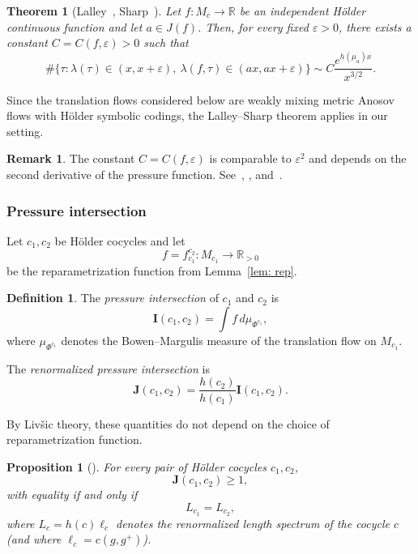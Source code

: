 \documentclass[12pt]{amsart}
\numberwithin{equation}{section}
\numberwithin{figure}{section}
\newtheorem{theorem}[equation]{Theorem}
\newtheorem{proposition}[equation]{Proposition}
\theoremstyle{definition}
\newtheorem{remark}[equation]{Remark}
\newtheorem{definition}[equation]{Definition}
\theoremstyle{plain}
\begin{document}
\begin{theorem}[{Lalley~\cite[Theorem~I]{Lalley97:AxiomA}, Sharp~\cite[Theorem~1]{Sharp92:PrimeOrbit}}]
\label{prop:lalley}
Let $f:M_c\to\mathbb R$ be an independent H\"older continuous function and let $a\in J(f)$. Then, for every fixed $\varepsilon>0$, there exists a constant $C=C(f,\varepsilon)>0$ such that
\[
\#\{
\tau:
\lambda(\tau)\in(x,x+\varepsilon),
\
\lambda(f,\tau)\in(ax,ax+\varepsilon)
\}
\sim
C\frac{e^{h(\mu_a)x}}{x^{3/2}}.
\]
\end{theorem}

Since the translation flows considered below are weakly mixing metric Anosov flows with H\"older symbolic codings, the Lalley--Sharp theorem applies in our setting.

\begin{remark}
\label{rmk:C_secondderivative}
The constant $C=C(f,\varepsilon)$ is comparable to $\varepsilon^2$ and depends on the second derivative of the pressure function. See~\cite[Thm.~5]{Lalley97:AxiomA}, \cite{Sharp98:Hyperbolic}, and~\cite[Theorem~1.2]{BL98:AxiomA}.
\end{remark}

\subsubsection{Pressure intersection}

Let $c_1,c_2$ be H\"older cocycles and let
\[
f=f_{c_1}^{c_2}:M_{c_1}\to\mathbb R_{>0}
\]
be the reparametrization function from Lemma~\ref{lem: rep}.

\begin{definition}
The \emph{pressure intersection} of $c_1$ and $c_2$ is
\[
\mathbf I(c_1,c_2)
=
\int f\,d\mu_{\Phi^{c_1}},
\]
where $\mu_{\Phi^{c_1}}$ denotes the Bowen--Margulis measure of the translation flow on $M_{c_1}$.

The \emph{renormalized pressure intersection} is
\[
\mathbf J(c_1,c_2)
=
\frac{h(c_2)}{h(c_1)}
\mathbf I(c_1,c_2).
\]
\end{definition}

By Liv\v{s}ic theory, these quantities do not depend on the choice of reparametrization function.

\begin{proposition}[{\cite[Proposition~3.8]{BCLS15:Pressure}}]
\label{thm:Jrigidity}
For every pair of H\"older cocycles $c_1,c_2$,
\[
\mathbf J(c_1,c_2)\geq 1,
\]
with equality if and only if
\[
L_{c_1}=L_{c_2},
\]
where $L_c=h(c)\ell_c$ denotes the renormalized length spectrum of the cocycle $c$ (and where $\ell_c=c(g,g^+)$).
\end{proposition}
\end{document}
